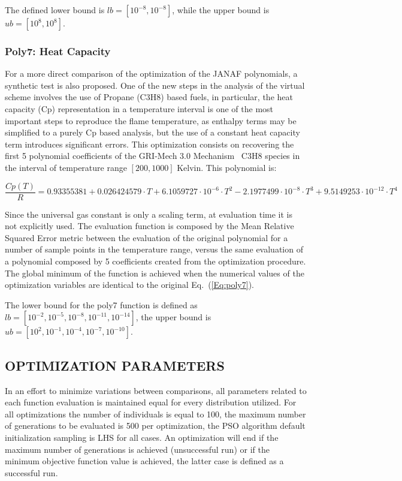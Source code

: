 \documentclass[10pt,fleqn,a4paper,twoside]{article}
\begin{document}
The defined lower bound is $lb = [10^{-8}, 10^{-8}]$, while the upper bound is $ub = [10^{8}, 10^{8}]$.


\subsubsection{Poly7: Heat Capacity}
For a more direct comparison of the optimization of the JANAF polynomials, a synthetic test is also proposed. One of the new steps in the analysis of the virtual scheme involves the use of Propane (C3H8) based
fuels, in particular, the heat capacity (Cp) representation in a temperature interval is one of the most important steps to reproduce the flame temperature, as enthalpy terms may be simplified to a 
purely Cp based analysis, but the use of a constant heat capacity term introduces significant errors. This optimization consists on recovering the first 5 polynomial coefficients of the GRI-Mech 3.0
Mechanism~\citep{GRIMech30} C3H8 species in the interval of temperature range $[200, 1000]$ Kelvin. This polynomial is:

\begin{equation}
\frac{Cp(T)}{R} = 0.93355381 +  0.026424579 \cdot T +  6.1059727\cdot10^{-6} \cdot T^2 - 2.1977499\cdot10^{-8} \cdot T^3 + 9.5149253\cdot 10^{-12} \cdot T^4
\label{Eq:poly7}
\end{equation}

Since the universal gas constant is only a scaling term, at evaluation time it is not explicitly used. The evaluation function is composed by the Mean Relative Squared Error metric between the 
evaluation of the original polynomial for a number of sample points in the temperature range, versus the same evaluation of a polynomial composed by 5 coefficients created from the optimization
procedure. The global minimum of the function is achieved when the numerical values of the optimization variables are identical to the original Eq.~(\ref{Eq:poly7}). 

The lower bound for the poly7 function is defined as $lb = [10^{-2}, 10^{-5}, 10^{-8}, 10^{-11}, 10^{-14}]$, the upper bound is $ub = [10^{2}, 10^{-1}, 10^{-4}, 10^{-7}, 10^{-10}]$.

\subsection{OPTIMIZATION PARAMETERS}

In an effort to minimize variations between comparisons, all parameters related to each function evaluation is maintained equal for every distribution utilized. For all optimizations the number of 
individuals is equal to 100, the maximum number of generations to be evaluated is 500 per optimization, the PSO algorithm default initialization sampling is LHS for all cases. An optimization
will end if the maximum number of generations is achieved (unsuccessful run) or if the minimum objective function value is achieved, the latter case is defined as a successful run.
\end{document}
